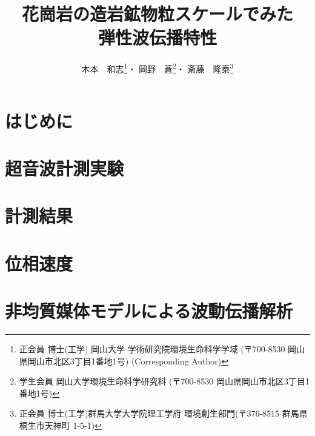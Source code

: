 \documentclass{jsce}
\title{
	花崗岩の造岩鉱物粒スケールでみた\\
	弾性波伝播特性
}%
\author{木本　和志\thanks{正会員 博士(工学) 
岡山大学 学術研究院環境生命科学学域
(〒700-8530 岡山県岡山市北区3丁目1番地1号)\email{kimoto@okayama-u.ac.jp} (Corresponding Author)}・
岡野　蒼\thanks{学生会員 岡山大学環境生命科学研究科 (〒700-8530 岡山県岡山市北区3丁目1番地1号)}・
斎藤　隆泰\thanks{正会員 博士(工学)群馬大学大学院理工学府 環境創生部門(〒376-8515 群馬県桐生市天神町 1-5-1)}
}
\begin{document}
\maketitle
\section{はじめに}
	
\section{超音波計測実験}
	
\section{計測結果}
	
\section{位相速度}
	
\section{非均質媒体モデルによる波動伝播解析}
	
\end{document}
